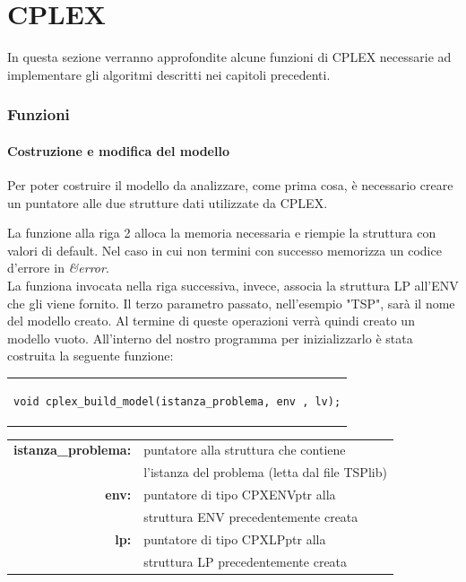 \appendix
\chapter{CPLEX}
In questa sezione verranno approfondite alcune funzioni di CPLEX necessarie ad implementare gli algoritmi descritti nei capitoli precedenti.

\subsection{Funzioni}
\subsubsection{Costruzione e modifica del modello}
Per poter costruire il modello da analizzare, come prima cosa, è necessario creare un puntatore alle due strutture dati utilizzate da CPLEX.

La funzione alla riga 2 alloca la memoria necessaria e riempie la struttura con valori di default. Nel caso in cui non termini con successo memorizza un codice d'errore in \textit{\&error}.\\
La funziona invocata nella riga successiva, invece, associa la struttura LP all'ENV che gli viene fornito. Il terzo parametro passato, nell'esempio "TSP", sarà il nome del modello creato.
Al termine di queste operazioni verrà quindi creato un modello vuoto. All'interno del nostro programma per inizializzarlo è stata costruita la seguente funzione:
\begin{center}
\begin{tabular}{c}
\begin{lstlisting}[linewidth=320pt, basicstyle=\footnotesize\sffamily,] 
void cplex_build_model(istanza_problema, env , lv);
\end{lstlisting}
\end{tabular}
\end{center}
\vspace{1cm}
\begin{table}[h]
\centering
\begin{tabular}{rl}
\textbf{istanza\_problema: } & {puntatore alla struttura che contiene} \\
&  {l'istanza del problema (letta dal file TSPlib)} \\
\textbf{env: } & {puntatore di tipo CPXENVptr alla}\\
& {struttura ENV precedentemente creata}\\
\textbf{lp: } & {puntatore di tipo CPXLPptr alla}\\
& {struttura LP  precedentemente creata}\\
\end{tabular}
\end{table}
